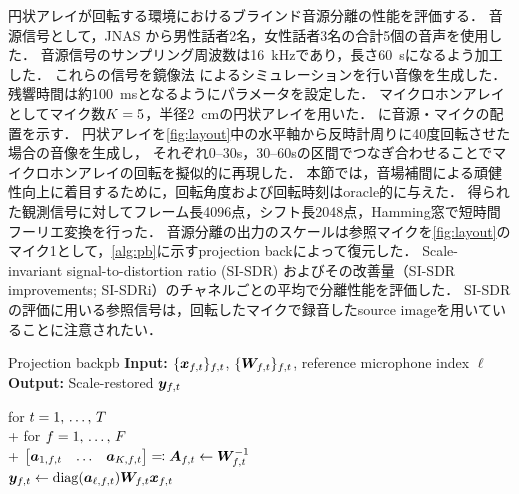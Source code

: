 \documentclass[sip,biber]{now-journal}
\begin{document}
円状アレイが回転する環境におけるブラインド音源分離の性能を評価する．
音源信号として，JNAS \cite{Itou:1999:AST}から男性話者2名，女性話者3名の合計5個の音声を使用した．
音源信号のサンプリング周波数は\SI{16}{\kilo\hertz}であり，長さ\SI{60}{\second}になるよう加工した．
これらの信号を鏡像法 \cite{Allen:1979:JASA} によるシミュレーションを行い音像を生成した．
残響時間は約\SI{100}{\milli\second}となるようにパラメータを設定した．
マイクロホンアレイとしてマイク数$K = 5$，半径\SI{2}{\cm}の円状アレイを用いた．
に音源・マイクの配置を示す．
円状アレイを\cref{fig:layout}中の水平軸から反時計周りに40度回転させた場合の音像を生成し，
それぞれ0--30\si{\second}，30--60\si{\second}の区間でつなぎ合わせることでマイクロホンアレイの回転を擬似的に再現した．
本節では，音場補間による頑健性向上に着目するために，回転角度および回転時刻はoracle的に与えた．
得られた観測信号に対してフレーム長4096点，シフト長2048点，Hamming窓で短時間フーリエ変換を行った．
音源分離の出力のスケールは参照マイクを\cref{fig:layout}のマイク1として，\cref{alg:pb}に示すprojection backによって復元した．
Scale-invariant signal-to-distortion ratio (SI-SDR) \cite{LeRoux:2019:ICASSP} およびその改善量（SI-SDR improvements; SI-SDRi）のチャネルごとの平均で分離性能を評価した．
SI-SDRの評価に用いる参照信号は，回転したマイクで録音したsource imageを用いていることに注意されたい．
\begin{algorithm}{Projection back}{pb}
  \textbf{Input:} $\{\Obs _{\ft}\} _{\ft}$, $\{\Demix _{\ft}\} _{\ft}$, reference microphone index $\ell$\\
  \textbf{Output:} Scale-restored $\Est _{\ft}$
  \begin{pseudo}
    for $t = 1,\, \dots,\, T$ \\+
      for $f = 1,\, \dots,\, F$ \\+
        $\begin{bmatrix} \steer _{1,\ft} & \dots & \steer _{\Mic,\ft} \end{bmatrix} \eqqcolon \Steer _{\ft} \gets \Demix _{\ft} ^{-1}$ \\
        $\Est _{\ft} \gets \mathrm{diag}(\steer _{\ell,\ft}) \Demix _{\ft} \Obs _{\ft}$
  \end{pseudo}
\end{algorithm}
\end{document}
